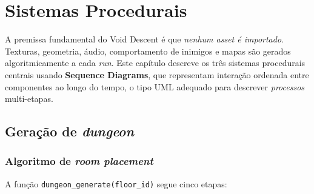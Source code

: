 \chapter{Sistemas Procedurais}

A premissa fundamental do Void Descent é que \emph{nenhum asset é importado}. Texturas,
geometria, áudio, comportamento de inimigos e mapas são gerados algoritmicamente a cada
\emph{run}. Este capítulo descreve os três sistemas procedurais centrais usando
\textbf{Sequence Diagrams}, que representam interação ordenada entre componentes ao
longo do tempo, o tipo UML adequado para descrever \emph{processos} multi-etapas.

\section{Geração de \emph{dungeon}}


\subsection{Algoritmo de \emph{room placement}}

A função \texttt{dungeon\_generate(floor\_id)} segue cinco etapas:

